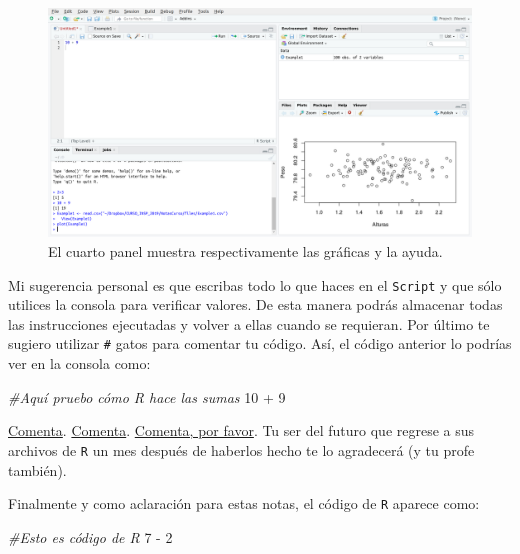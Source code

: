 \documentclass[
]{book}
\newenvironment{Shaded}{\begin{snugshade}}{\end{snugshade}}
\newcommand{\CommentTok}[1]{\textcolor[rgb]{0.56,0.35,0.01}{\textit{#1}}}
\newcommand{\DecValTok}[1]{\textcolor[rgb]{0.00,0.00,0.81}{#1}}
\newcommand{\SpecialCharTok}[1]{\textcolor[rgb]{0.00,0.00,0.00}{#1}}
\begin{document}
\begin{figure}

{\centering \includegraphics[width=40in]{images/RStudio7} 

}

\caption{El cuarto panel muestra respectivamente las gráficas y la ayuda.}\label{fig:unnamed-chunk-224}
\end{figure}

Mi sugerencia personal es que escribas todo lo que haces en el \texttt{Script} y que sólo utilices la consola para verificar valores. De esta manera podrás almacenar todas las instrucciones ejecutadas y volver a ellas cuando se requieran. Por último te sugiero utilizar \texttt{\#} gatos para comentar tu código. Así, el código anterior lo podrías ver en la consola como:

\begin{Shaded}
\begin{Highlighting}[]
\CommentTok{\#Aquí pruebo cómo R hace las sumas}
\DecValTok{10} \SpecialCharTok{+} \DecValTok{9}
\end{Highlighting}
\end{Shaded}

\href{https://www.freecodecamp.org/news/code-comments-the-good-the-bad-and-the-ugly-be9cc65fbf83/}{Comenta}. \href{https://www.c-sharpcorner.com/blogs/why-comments-are-important-while-writing-a-code}{Comenta}. \href{https://blog.codinghorror.com/code-tells-you-how-comments-tell-you-why/}{Comenta, por favor}. Tu ser del futuro que regrese a sus archivos de \texttt{R} un mes después de haberlos hecho te lo agradecerá (y tu profe también).

Finalmente y como aclaración para estas notas, el código de \texttt{R} aparece como:

\begin{Shaded}
\begin{Highlighting}[]
\CommentTok{\#Esto es código de R}
\DecValTok{7} \SpecialCharTok{{-}} \DecValTok{2}
\end{Highlighting}
\end{Shaded}
\end{document}
